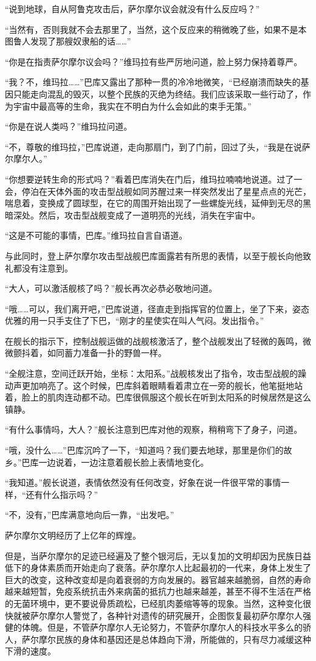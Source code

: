 “说到地球，自从阿鲁克攻击后，萨尔摩尔议会就没有什么反应吗？”

“当然有，否则我就不会去那里了，当然，这个反应来的稍微晚了些，如果不是本图鲁人发现了那艘奴隶船的话……”

“你是在指责萨尔摩尔议会吗？”维玛拉有些严厉地问道，脸上努力保持着尊严。

“我？不，维玛拉……”巴库又露出了那种一贯的冷冷地微笑，“已经崩溃而缺失的基因只能走向混乱的毁灭，以整个民族的灭绝为终结。我们应该采取一些行动了，作为宇宙中最高等的生命，我实在不明白为什么会如此的束手无策。”

“你是在说人类吗？”维玛拉问道。

“不，尊敬的维玛拉，”巴库说道，走向那扇门，到了门前，回过了头，“我是在说萨尔摩尔人。”

“你想要逆转生命的形式吗？”看着巴库消失在门后，维玛拉喃喃地说道。过了一会，停泊在天体外面的攻击型战舰如同苏醒过来一样突然发出了星星点点的光芒，喘息着，变换成了圆球型，在它的周围开始出现了一些螺旋光线，延伸到无尽的黑暗深处。然后，攻击型战舰变成了一道明亮的光线，消失在宇宙中。

“这是不可能的事情，巴库。”维玛拉自言自语道。

与此同时，登上萨尔摩尔攻击型战舰巴库面露若有所思的表情，以至于舰长向他致礼都没有注意到。

“大人，可以激活舰核了吗？”舰长再次必恭必敬地问道。

“哦……可以，我们离开吧，”巴库说道，径直走到指挥官的位置上，坐了下来，姿态优雅的用一只手支住了下巴，“刚才的星使实在叫人气闷。发出指令。”

在舰长的指示下，控制战舰运做的战舰核激活了，整个战舰发出了轻微的轰鸣，微微颤抖着，如同蓄力准备一扑的野兽一样。

“全舰注意，空间迁跃开始，坐标：太阳系。”战舰核发出了指令，攻击型战舰的躁动声更加响亮了。这个时候，巴库斜着眼睛看着肃立在一旁的舰长，他笔挺地站着，脸上的肌肉连动都不动。巴库很佩服这个舰长在听到太阳系的时候居然是这么镇静。

“有什么事情吗，大人？”舰长注意到巴库对他的观察，稍稍弯下了身子，问道。

“哦，没什么……”巴库沉吟了一下，“知道吗？我们要去地球，那里是你们的故乡。”巴库一边说着，一边注意着舰长脸上表情地变化。

“我知道。”舰长说道，表情依然没有任何改变，好象在说一件很平常的事情一样，“还有什么指示吗？”

“不，没有，”巴库满意地向后一靠，“出发吧。”

萨尔摩尔文明经历了上亿年的辉煌。

但是，当萨尔摩尔的足迹已经遍及了整个银河后，无以复加的文明却因为民族日益低下的身体素质而开始走向了衰落。萨尔摩尔人比起最初的一代来，身体上发生了巨大的改变，这种改变却是向着衰弱的方向发展的。器官越来越脆弱，自然的寿命越来越短暂，免疫系统抗击外来病菌的抵抗力也越来越差，甚至不得不生活在严格的无菌环境中，更不要说骨质疏松，已经肌肉萎缩等等的现象。当然，这种变化很快就被萨尔摩尔人警觉了，各种针对遗传的研究展开，企图恢复最初萨尔摩尔人强健的体魄。但是，不管萨尔摩尔人无论努力，不管萨尔摩尔人的科技水平多么的骄人，萨尔摩尔民族的身体和基因还是总体趋向下滑，所能做的，只有尽力减缓这种下滑的速度。

